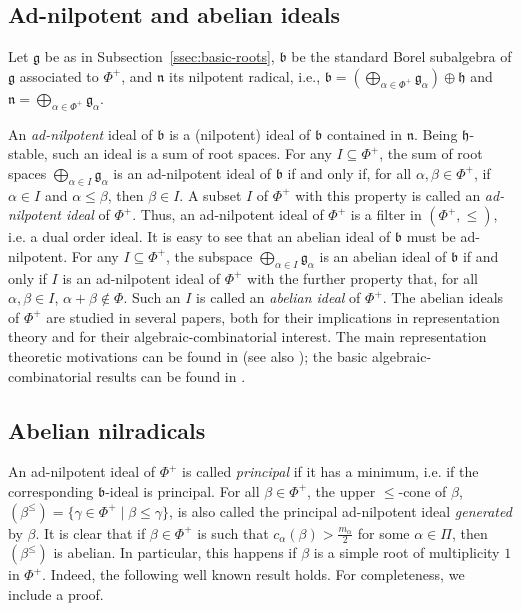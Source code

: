 \documentclass[ALCO,published]{cedram}
\theoremstyle{plain}
\newcommand\mf{\mathfrak}
\newcommand\al{\alpha}
\newcommand\be{\beta}
\newcommand\ga{\gamma}
\renewcommand{\leq}{\leqslant}
\begin{document}
\subsection{Ad-nilpotent and abelian ideals}\label{ssec:adnilpotent}

\par
Let $\mf g$ be as in Subsection~\ref{ssec:basic-roots}, 
$\mf b$ be the standard Borel subalgebra of $\mf g$ associated to $\Phi^+$,  and $\mf n$ its nilpotent radical, i.e., $\mf b=\left(\bigoplus_{\al\in\Phi^+}\mf g_\al\right)\oplus \mf h$ and $\mf n=\bigoplus_{\al\in\Phi^+}\mf g_\al$. 

\par
An {\it ad-nilpotent} ideal of $\mf b$ is a (nilpotent) ideal of $\mf b$ contained in $\mf n$. 
Being $\mf h$-stable, such an ideal is a sum of root spaces.
For any $I\subseteq \Phi^+$, the sum of root spaces $\bigoplus_{\al\in I} \mf g_\al$ is an ad-nilpotent ideal of $\mf b$ if and only if, for all $\al, \beta\in \Phi^+$, if $\al\in I$ and $\al\leq \beta$, then $\beta\in I$. 
A subset $I$ of $\Phi^+$ with this property is called an {\it ad-nilpotent ideal} of $\Phi^+$.
Thus, an ad-nilpotent ideal of $\Phi^+$ is a filter in $(\Phi^+, \leq)$, i.e. a dual order ideal. 
It is easy to see that an abelian ideal of $\mf b$ must be ad-nilpotent. 
For any  $I\subseteq \Phi^+$, the subspace $\bigoplus_{\al\in I} \mf g_\al$ is an abelian ideal of $\mf b$ if and only if $I$ is an ad-nilpotent ideal of $\Phi^+$ with the further property that, for all $\al, \beta\in I$, $\al+\beta\not\in \Phi$. 
Such an $I$ is called an {\it abelian ideal} of $\Phi^+$.
The  abelian ideals of $\Phi^+$ are studied in several papers, both for their implications in representation theory and for their algebraic-combinatorial interest. 
The main representation theoretic motivations  can be found in \cite{Ko1, Ko2} (see also \cite{CMP}); the basic algebraic-combinatorial results can be found in \cite{CPadnilp1, CPab, Pan, Su}.


\subsection{Abelian nilradicals}\label{ssec:abnil}

\par
An ad-nilpotent ideal of $\Phi^+$ is called {\it principal} if it has a minimum, i.e. if the corresponding $\mf b$-ideal is principal. 
For all $\be\in \Phi^+$, the upper $\leq$-cone of $\be$, $(\be^\leq)=\{\ga\in \Phi^+\mid \be\leq \ga\}$, is also called the principal ad-nilpotent ideal {\it generated} by $\be$.  
It is clear that if $\be\in \Phi^+$ is such that $c_\al(\be)>\frac{m_\al}{2}$ for some $\al\in \Pi$, then $(\be^\leq)$ is abelian. 
In particular, this happens if $\be$ is a simple root of  multiplicity $1$ in $\Phi^+$. 
Indeed, the following well known result holds. 
For completeness, we include a proof.
\par
\end{document}
